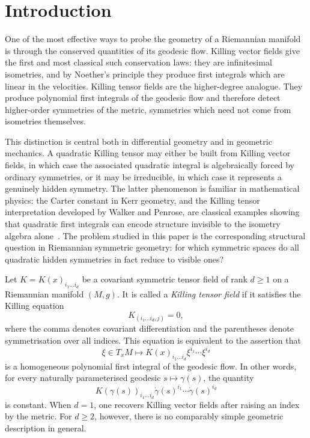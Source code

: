 \documentclass[12pt,reqno]{amsart}
\newcommand \<{\langle}
\renewcommand \>{\rangle}
\theoremstyle{definition}
\theoremstyle{remark}
\begin{document}
	
	\maketitle
	
	\section{Introduction}
	\label{s:intro}
	
	One of the most effective ways to probe the geometry of a Riemannian manifold is through the conserved quantities of its geodesic flow. Killing vector fields give the first and most classical such conservation laws: they are infinitesimal isometries, and by Noether's principle they produce first integrals which are linear in the velocities.  Killing tensor fields are the higher-degree analogue. They produce polynomial first integrals of the geodesic flow and therefore detect higher-order symmetries of the metric, symmetries which need not come from isometries themselves.
	
	This distinction is central both in differential geometry and in geometric mechanics. A quadratic Killing tensor may either be built from Killing vector fields, in which case the associated quadratic integral is algebraically forced by ordinary symmetries, or it may be irreducible, in which case it represents a genuinely hidden symmetry. The latter phenomenon is familiar in mathematical physics: the Carter constant in Kerr geometry, and the Killing tensor interpretation developed by Walker and Penrose, are classical examples showing that quadratic first integrals can encode structure invisible to the isometry algebra alone~\cite{Car,WP}. The problem studied in this paper is the corresponding structural question in Riemannian symmetric geometry: for which symmetric spaces do all quadratic hidden symmetries in fact reduce to visible ones?
	
	Let $K=K(x)_{i_1\dots i_d}$ be a covariant symmetric tensor field of rank $d\geq 1$ on a Riemannian manifold $(M,g)$. It is called a \emph{Killing tensor field} if it satisfies the Killing equation
	\begin{equation*}
		K_{(i_1\dots i_d,j)}=0,
	\end{equation*}
	where the comma denotes covariant differentiation and the parentheses denote symmetrisation over all indices. This equation is equivalent to the assertion that
	\[
	\xi\in T_xM
	\longmapsto
	K(x)_{i_1\dots i_d}\xi^{i_1}\cdots \xi^{i_d}
	\]
	is a homogeneous polynomial first integral of the geodesic flow. In other words, for every naturally parameterised geodesic $s\mapsto \gamma(s)$, the quantity
	\[
	K(\gamma(s))_{i_1\dots i_d}
	\dot\gamma(s)^{i_1}\cdots \dot\gamma(s)^{i_d}
	\]
	is constant. When $d=1$, one recovers Killing vector fields after raising an index by the metric. For $d\geq 2$, however, there is no comparably simple geometric description in general.
	
\end{document}
